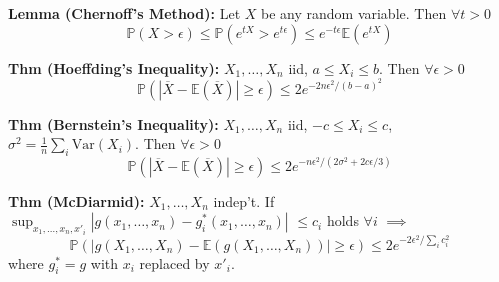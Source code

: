 \documentclass[10pt,twocolumn]{article}
\begin{document}
    \textbf{Lemma (Chernoff's Method):}
    Let $X$ be any random variable. Then $\forall t>0$
    \begin{equation}
        \mathbb{P}(X>\epsilon) \leq \mathbb{P}(e^{tX}>e^{t\epsilon}) \leq e^{-t\epsilon} \mathbb{E}(e^{tX})
    \end{equation}

    \textbf{Thm (Hoeffding's Inequality):}
    $X_{1},\ldots,X_{n}$ iid, $a \leq X_{i} \leq b$. Then $\forall \epsilon >0$
    \begin{equation}
        \mathbb{P} \left(\left| \overline{X} - \mathbb{E}\left(\overline{X}\right) \right| \geq \epsilon \right) \leq 2e^{-2n\epsilon^{2}/(b-a)^{2}}
    \end{equation}

    \textbf{Thm (Bernstein's Inequality):}
    $X_{1},\ldots,X_{n}$ iid, $-c \leq X_{i} \leq c$, $\sigma^2 = \frac{1}{n}\sum_i \text{Var}(X_i)$. Then $\forall \epsilon >0$
    \begin{equation}
        \mathbb{P} \left(\left| \overline{X} - \mathbb{E}\left(\overline{X}\right) \right| \geq \epsilon \right) \leq 2e^{-n\epsilon^2/(2\sigma^2 + 2c\epsilon/3)}
    \end{equation}

    \textbf{Thm (McDiarmid):} $X_{1},\ldots,X_{n}$ indep't. If\\
    $\sup_{x_{1},\ldots,x_{n},x'_{i}} \left| g(x_{1},\ldots,x_{n}) - g_{i}^{*}(x_{1},\ldots,x_{n}) \right|$ $\leq c_{i}$ holds $\forall i$ $\implies$
    \begin{equation}
        \mathbb{P} \left(\left| g(X_{1},\ldots,X_{n})-\mathbb{E}(g(X_{1},\ldots,X_{n})) \right| \geq \epsilon \right) \leq 2e^{-2\epsilon^{2}/\sum_{i}c_{i}^{2}}
    \end{equation}
    where $g_{i}^{*} = g$ with $x_{i}$ replaced by $x'_{i}$.
\end{document}
